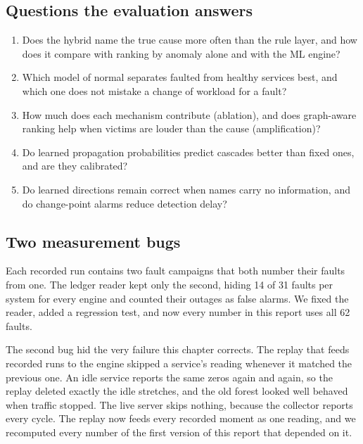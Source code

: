 \subsection{Questions the evaluation answers}
\begin{enumerate}[label=Q\arabic*.]
\item Does the hybrid name the true cause more often than the rule layer, and how does it compare with ranking by anomaly alone and with the ML engine?
\item Which model of normal separates faulted from healthy services best, and which one does not mistake a change of workload for a fault?
\item How much does each mechanism contribute (ablation), and does graph-aware ranking help when victims are louder than the cause (amplification)?
\item Do learned propagation probabilities predict cascades better than fixed ones, and are they calibrated?
\item Do learned directions remain correct when names carry no information, and do change-point alarms reduce detection delay?
\end{enumerate}

\subsection{Two measurement bugs}
\label{sec:bug}
Each recorded run contains two fault campaigns that both number their faults from one. The ledger reader kept only the second, hiding 14 of 31 faults per system for every engine and counted their outages as false alarms. We fixed the reader, added a regression test, and now every number in this report uses all 62 faults.

\label{sec:bug2}
The second bug hid the very failure this chapter corrects. The replay that feeds recorded runs to the engine skipped a service's reading whenever it matched the previous one. An idle service reports the same zeros again and again, so the replay deleted exactly the idle stretches, and the old forest looked well behaved when traffic stopped. The live server skips nothing, because the collector reports every cycle. The replay now feeds every recorded moment as one reading, and we recomputed every number of the first version of this report that depended on it.
